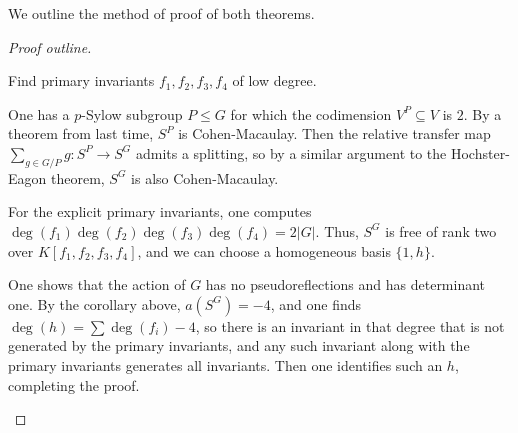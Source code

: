 \documentclass[12pt]{amsart}
\theoremstyle{definition}
\numberwithin{equation}{theorem}
\def\to{\longrightarrow}
\begin{document}
We outline the method of proof of both theorems.
\begin{proof}[Proof outline]
\begin{asparaenum}
\item Find primary invariants $f_1,f_2,f_3,f_4$ of low degree.
\item One has a $p$-Sylow subgroup $P\leq G$ for which the codimension $V^P  \subseteq V$ is $2$. By a theorem from last time, $S^P$ is Cohen-Macaulay. Then the relative transfer map $\sum_{g\in G/P} g: S^P \to S^G$ admits a splitting, so by a similar argument to the Hochster-Eagon theorem, $S^G$ is also Cohen-Macaulay.
\item For the explicit primary invariants, one computes $\deg(f_1) \deg(f_2)\deg(f_3) \deg(f_4) = 2 |G|$. Thus, $S^G$ is free of rank two over $K[f_1,f_2,f_3,f_4]$, and we can choose a homogeneous basis $\{1,h\}$. 
\item One shows that the action of $G$ has no pseudoreflections and has determinant one. By the corollary above, $a(S^G) =-4$, and one finds $\deg(h)= \sum \deg(f_i) - 4$, so there is an invariant in that degree that is not generated by the primary invariants, and any such invariant along with the primary invariants generates all invariants. Then one identifies such an $h$, completing the proof.\qedhere
\end{asparaenum} 
\end{proof}



\begin{comment}
\end{comment}

\vfill
\end{document}
